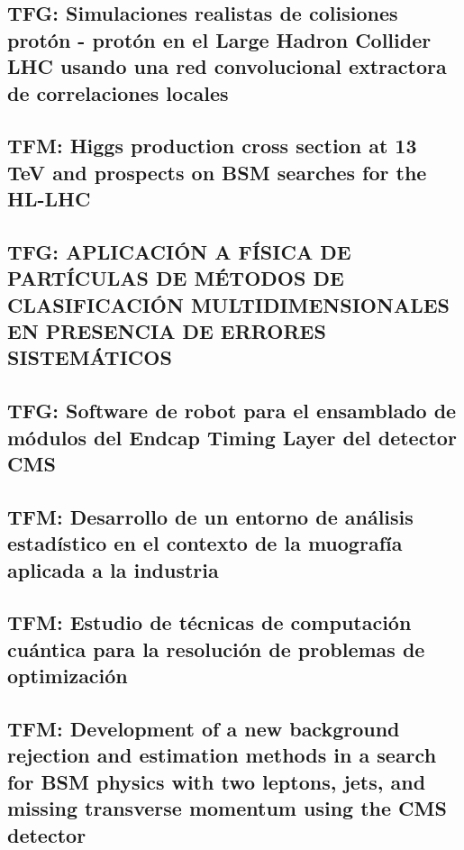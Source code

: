 \documentclass[a4paper, 11pt, twoside, openright]{report}
\begin{document}
\subsection{TFG: Simulaciones realistas de colisiones protón - protón en el Large Hadron Collider LHC usando una red convolucional extractora de correlaciones locales}


\subsection{TFM: Higgs production cross section at 13 TeV and prospects on BSM searches for the HL-LHC}


\subsection{TFG: APLICACIÓN A FÍSICA DE PARTÍCULAS DE MÉTODOS DE CLASIFICACIÓN MULTIDIMENSIONALES EN PRESENCIA DE ERRORES SISTEMÁTICOS}


\subsection{TFG: Software de robot para el ensamblado de módulos del Endcap Timing Layer del detector CMS}


\subsection{TFM: Desarrollo de un entorno de análisis estadístico en el contexto de la muografía aplicada a la industria}


\subsection{TFM: Estudio de técnicas de computación cuántica para la resolución de problemas de optimización}


\subsection{TFM: Development of a new background rejection and estimation methods in a search for BSM physics with two leptons, jets, and missing transverse momentum using the CMS detector}

\end{document}
